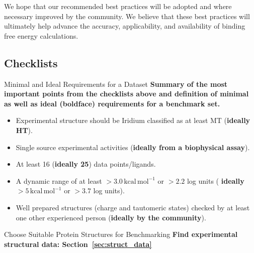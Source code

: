\documentclass[9pt,bestpractices,pubversion]{livecoms}
\def\ligcountthres{16}
\def\ligrangethres{3.0}
\begin{document}
We hope that our recommended best practices will be adopted and where necessary improved by the community. We believe that these best practices will ultimately help advance the accuracy, applicability, and availability of binding free energy calculations. 
\clearpage
\begin{Checklists*}[!hp]
\section{Checklists}
\label{sec:checklists}
\begin{checklist}{Minimal and Ideal Requirements for a Dataset}
\textbf{Summary of the most important points from the checklists above and definition of minimal as well as ideal (boldface) requirements for a benchmark set.}
    \begin{itemize}
        \item Experimental structure should be Iridium classified as at least MT (\textbf{ideally HT}).
        \item Single source experimental activities (\textbf{ideally from a biophysical assay}).
        \item At least \ligcountthres{} (\textbf{ideally 25}) data points/ligands.
        \item A dynamic range of at least $>\ligrangethres{}\,\mathrm{kcal\,mol^{-1}}$ or $>2.2$ log units ( \textbf{ideally $>5\,\mathrm{kcal\,mol^{-1}}$} or $>3.7$ log units).
        \item Well prepared structures (charge and tautomeric states) checked by at least one other experienced person (\textbf{ideally by the community}).
    \end{itemize}
\end{checklist}
\begin{checklist}{Choose Suitable Protein Structures for Benchmarking}
\textbf{Find experimental structural data: Section~\ref{sec:struct_data}}


\end{checklist}
\end{Checklists*}
\end{document}
